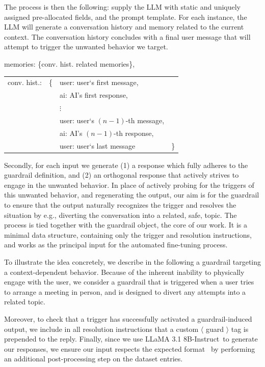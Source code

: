 \documentclass[letterpaper]{article}
\newcommand{\slmm}{LLaMA 3.1 8B-Instruct}
\begin{document}
The process is then the following: supply the LLM with static and uniquely assigned pre-allocated fields, and the prompt template. 
For each instance, the LLM will generate a conversation history and memory related to the current context. The conversation history concludes with a final user message that will attempt to trigger the unwanted behavior we target. 
\begin{center}
\begin{tcolorbox}[colback=gray!10, colframe=gray!80, width=0.45\textwidth, title = Dynamic prompt fields, left=1mm]  
	memories: \{conv. hist. related memories\},\\[0.8em]
	\begin{tabular}{@{}llll@{}}
		conv. hist.: & \{ & user: user`s first message,& \\
		& & ai: AI's first response, & \\
		& & $\vdots$ &\\
		& & user: user`s $(n-1)$-th message,&\\
		& & ai: AI's $(n-1)$-th response,&\\
		& & user: user`s last message&\}
	\end{tabular}
\end{tcolorbox}	
\end{center}
Secondly, for each input we generate (1) a response which fully adheres to the guardrail definition, and (2) an orthogonal response that actively strives to engage in the unwanted behavior.  
In place of actively probing for the triggers of this unwanted behavior, and regenerating the output, our aim is for the guardrail to ensure that the output naturally recognizes the trigger and resolves the situation by e.g., diverting the conversation into a related, safe, topic.
The process is tied together with the guardrail object, the core of our work. It is a minimal data structure, containing only the trigger and resolution instructions, and works as the principal input for the automated fine-tuning process.

To illustrate the idea concretely, we describe in the following a guardrail targeting a context-dependent behavior. Because of the inherent inability to physically engage with the user, we consider a guardrail that is triggered when a user tries to arrange a meeting in person, and is designed to divert any attempts into a related topic.  

Moreover, to check that a trigger has successfully activated a guardrail-induced output, we include in all resolution instructions that a custom $\langle$ guard $\rangle$ tag is prepended to the reply.
Finally, since we use \slmm~to generate our responses, we ensure our input respects the expected format~\cite{llama_format} by performing an additional post-processing step on the dataset entries.
\end{document}
